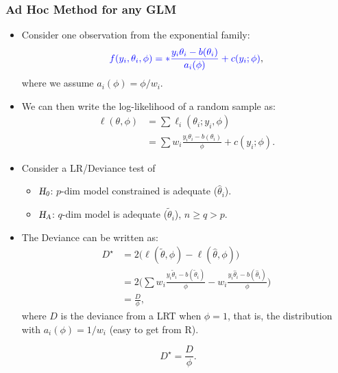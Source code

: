 \documentclass[oneside]{book}\usepackage[]{graphicx}\usepackage[svgnames]{xcolor}
\let\exp\relax%
\newcommand{\HN}{\textsl{H}_{\textsl{0}}}%
\newcommand{\HA}{\textsl{H}_{\textsl{A}}}%
\begin{document}
\subsubsection*{Ad Hoc Method for any GLM}
\begin{itemize}
    \item Consider one observation from the exponential family:
          \[ \textcolor{Blue}{f(y_i,\theta_i,\phi)=\exp*{\frac{y_i\theta_i-b(\theta_i)}{a_i(\phi)}+c(y_i;\phi)}}, \]
          where we assume $ a_i(\phi)=\phi/w_i $.
    \item We can then write the log-likelihood of a random sample as:
          \begin{align*}
              \ell(\theta,\phi)
               & =\sum \ell_i(\theta_i;y_i,\phi)                             \\
               & =\sum w_i \frac{y_i\theta_i-b(\theta_i)}{\phi}+c(y_i;\phi).
          \end{align*}
    \item Consider a LR/Deviance test of
          \begin{itemize}
              \item $ \HN $: $ p $-dim model constrained is adequate ($ \hat{\theta}_i $).
              \item $ \HA $: $ q $-dim model is adequate ($ \tilde{\theta}_i $), $ n\ge q>p $.
          \end{itemize}
    \item The Deviance can be written as:
          \begin{align*}
              D^\star
               & =2\bigl(\ell(\tilde{\theta},\phi)-\ell(\hat{\theta},\phi)\bigr)                                                                         \\
               & =2\biggl(\sum  w_i \frac{y_i\tilde{\theta}_i-b(\tilde{\theta}_i)}{\phi} -  w_i \frac{y_i\hat{\theta}_i-b(\hat{\theta}_i)}{\phi} \biggr) \\
               & =\frac{D}{\phi},
          \end{align*}
          where $ D $ is the deviance from a LRT when $ \phi=1 $, that is, the distribution with $ a_i(\phi)=1/w_i $ (easy to get from R).
\end{itemize}
\[ D^\star=\frac{D}{\phi}. \]
\end{document}
